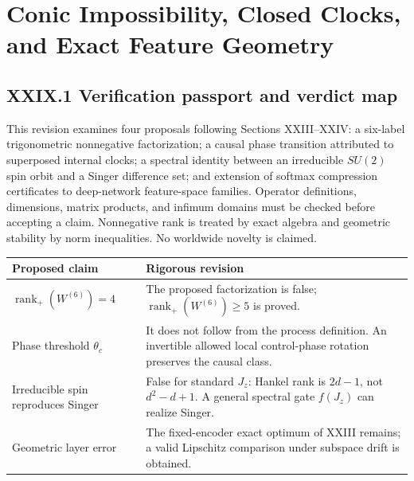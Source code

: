 \documentclass[11pt,a4paper,oneside]{book}
\DeclareMathOperator{\rank}{rank}\DeclareMathOperator{\Tr}{Tr}
\begin{document}
\chapter{Conic Impossibility, Closed Clocks, and Exact Feature Geometry}
\section*{XXIX.1 Verification passport and verdict map}
This revision examines four proposals following Sections XXIII--XXIV: a six-label trigonometric nonnegative factorization; a causal phase transition attributed to superposed internal clocks; a spectral identity between an irreducible $SU(2)$ spin orbit and a Singer difference set; and extension of softmax compression certificates to deep-network feature-space families. Operator definitions, dimensions, matrix products, and infimum domains must be checked before accepting a claim. Nonnegative rank is treated by exact algebra and geometric stability by norm inequalities. No worldwide novelty is claimed.
\begin{center}\small\begin{tabularx}{\textwidth}{@{}p{}X@{}}\toprule
Proposed claim&Rigorous revision\\\midrule
$\rank_+(W^{(6)})=4$&The proposed factorization is false; $\rank_+(W^{(6)})\ge5$ is proved.\\
Phase threshold $\theta_c$&It does not follow from the process definition. An invertible allowed local control-phase rotation preserves the causal class.\\
Irreducible spin reproduces Singer&False for standard $J_z$: Hankel rank is $2d-1$, not $d^2-d+1$. A general spectral gate $f(J_z)$ can realize Singer.\\
Geometric layer error&The fixed-encoder exact optimum of XXIII remains; a valid Lipschitz comparison under subspace drift is obtained.\\\bottomrule
\end{tabularx}\end{center}
\end{document}
